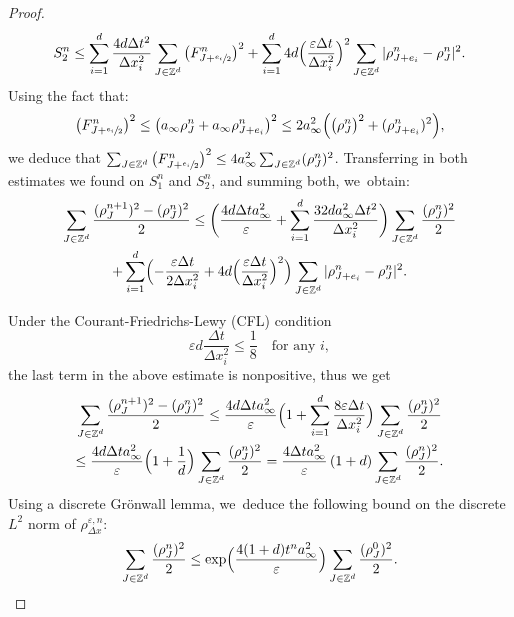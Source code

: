 \documentclass[11pt]{article}
\numberwithin{equation}{section}
\def\ZZ{\mathbb{Z}}
\def\eps{\varepsilon}
\def\dt{\Delta t}
\def\dx{\Delta x}
\theoremstyle{plain}
\theoremstyle{definition}
\begin{document}
\begin{proof}
\[
S_2^n \leq \sum_{i=1}^{d} \frac{4 d \dt^2}{\dx_i^2} \sum_{J \in \ZZ^d} \big(F_{J+ \sfrac{e_i}{2}}^n\big)^2 + \sum_{i=1}^{d} 4 d \Bigl(\frac{\eps\dt}{\dx_i^2}\Bigr)^2 \sum_{J \in \ZZ^d} |\rho_{J+e_i}^n - \rho_J^n|^2.
\]
Using the fact that:
\[
\big(F_{J+ \sfrac{e_i}{2}}^n\big)^2 \leq \big(a_\infty \rho_J^n + a_\infty \rho_{J+e_i}^n\big)^2 \leq 2a_\infty^2 \Big(\big(\rho_J^n\big)^2 +(\rho_{J+e_i}^n)^2\Big),
\]
we deduce that $\sum_{J \in \ZZ^d} \big(F_{J+ \sfrac{e_i}{2}}^n\big)^2 \leq 4a_\infty^2 \sum_{J\in\ZZ^d}(\rho_J^n)^2$. Transferring in both estimates we found on $S_1^n$ and $S_2^n$, and summing both, we~obtain:
\begin{multline}\label{eq:disH1estimate:1}
\sum_{J \in \ZZ^d} \frac{(\rho_J^{n+1})^2 -(\rho_J^n)^2}{2}\leq \biggl(\frac{4d\dt a_\infty^2}{\eps} + \sum_{i=1}^{d} \frac{32 d a_\infty^2\dt^2}{\dx_i^2}\biggr) \sum_{J\in\ZZ^d} \frac{(\rho_J^n)^2}{2} \\
+ \sum_{i=1}^{d} \Bigl(-\frac{\eps\dt}{2\dx_i^2} + 4 d \Bigl(\frac{\eps\dt}{\dx_i^2}\Bigr)^2\Bigr) \sum_{J \in \ZZ^d} |\rho_{J+e_i}^n - \rho_J^n|^2.
\end{multline}

Under the Courant-Friedrichs-Lewy (CFL) condition
\begin{equation*}
\eps d \frac{\dt}{\dx_i^2} \leq \frac 18 \quad \text{for any } i,
\end{equation*}
the last term in the above estimate is nonpositive, thus we get
\begin{multline*}
\sum_{J \in \ZZ^d} \frac{(\rho_J^{n+1})^2 -(\rho_J^n)^2}{2} \leq \frac{4d\dt a_\infty^2}{\eps}\Bigl(1 + \sum_{i=1}^{d} \frac{8\eps\dt}{\dx_i^2}\Bigr) \sum_{J\in\ZZ^d} \frac{(\rho_J^n)^2}{2} \\
\leq \frac{4d\dt a_\infty^2}{\eps}\Bigl(1 + \frac{1}{d}\Bigr) \sum_{J\in\ZZ^d} \frac{(\rho_J^n)^2}{2} = \frac{4\dt a_\infty^2}{\eps}\left(1 + d\right) \sum_{J\in\ZZ^d} \frac{(\rho_J^n)^2}{2}.
\end{multline*}
Using a discrete Grönwall lemma, we~deduce the following bound on the discrete $L^2$ norm of $\rho_{\dx}^{\eps,n}$:
\[
\sum_{J \in \ZZ^d} \frac{(\rho_J^n)^2}{2} \leq \exp\Bigl(\frac{4(1 + d)t^n a_\infty^2}{\eps}\Bigr) \sum_{J \in \ZZ^d} \frac{(\rho_J^0)^2}{2}.
\]


\end{proof}
\end{document}
